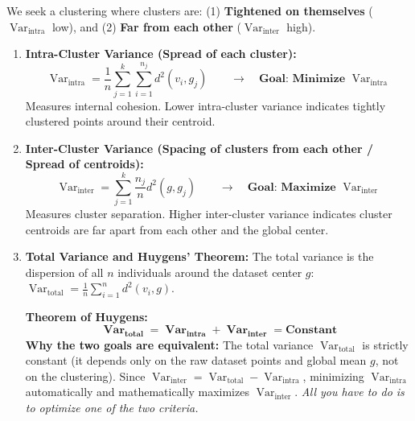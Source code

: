 \documentclass[10pt,a4paper]{article}
\begin{document}
\vspace{2pt}

\par\vspace{2pt}
We seek a clustering where clusters are: (1) \textbf{Tightened on themselves} ($\operatorname{Var}_{\text{intra}}$ low), and (2) \textbf{Far from each other} ($\operatorname{Var}_{\text{inter}}$ high).

\begin{enumerate}[leftmargin=12pt, itemsep=2pt, topsep=1pt, parsep=0pt]
    \item \textbf{Intra-Cluster Variance (Spread of each cluster):}
    \[
    \operatorname{Var}_{\text{intra}} = \frac{1}{n} \sum_{j=1}^k \sum_{i=1}^{n_j} d^2(v_i, g_j) \qquad \longrightarrow \quad \textbf{Goal: Minimize } \operatorname{Var}_{\text{intra}}
    \]
    Measures internal cohesion. Lower intra-cluster variance indicates tightly clustered points around their centroid.

    \item \textbf{Inter-Cluster Variance (Spacing of clusters from each other / Spread of centroids):}
    \[
    \operatorname{Var}_{\text{inter}} = \sum_{j=1}^k \frac{n_j}{n} d^2(g, g_j) \qquad \longrightarrow \quad \textbf{Goal: Maximize } \operatorname{Var}_{\text{inter}}
    \]
    Measures cluster separation. Higher inter-cluster variance indicates cluster centroids are far apart from each other and the global center.

    \item \textbf{Total Variance and Huygens' Theorem:}
    The total variance is the dispersion of all $n$ individuals around the dataset center $g$:
    $\operatorname{Var}_{\text{total}} = \frac{1}{n} \sum_{i=1}^n d^2(v_i, g)$.
    \begin{tcolorbox}[
        colframe=accentred,
        colback=white,
        arc=1.5mm,
        boxrule=0.5pt,
        left=6pt, right=6pt, top=2.5pt, bottom=2.5pt
    ]
    \textbf{Theorem of Huygens:}
    \[
    \mathbf{\operatorname{Var}_{\text{total}} = \operatorname{Var}_{\text{intra}} + \operatorname{Var}_{\text{inter}} = \text{Constant}}
    \]
    \textbf{Why the two goals are equivalent:} The total variance $\operatorname{Var}_{\text{total}}$ is strictly constant (it depends only on the raw dataset points and global mean $g$, not on the clustering). Since $\operatorname{Var}_{\text{inter}} = \operatorname{Var}_{\text{total}} - \operatorname{Var}_{\text{intra}}$, minimizing $\operatorname{Var}_{\text{intra}}$ automatically and mathematically maximizes $\operatorname{Var}_{\text{inter}}$. \textit{All you have to do is to optimize one of the two criteria.}
    \end{tcolorbox}


\end{enumerate}
\end{document}
